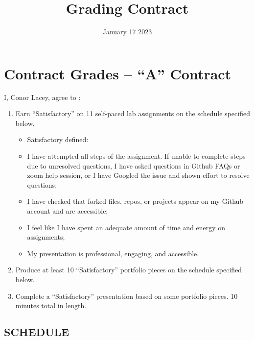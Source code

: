 \documentclass[
]{article}
\title{Grading Contract}
\author{}
\date{\vspace{-2.5em}January 17 2023}
\providecommand{\tightlist}{%
  \setlength{\itemsep}{0pt}\setlength{\parskip}{0pt}}
\begin{document}
\maketitle

\hypertarget{contract-grades-a-contract}{%
\section{Contract Grades -- ``A''
Contract}\label{contract-grades-a-contract}}

I, Conor Lacey, agree to :

\begin{enumerate}
\def\labelenumi{\arabic{enumi})}
\tightlist
\item
  Earn ``Satisfactory'' on 11 self-paced lab assignments on the schedule
  specified below.

  \begin{itemize}
  \tightlist
  \item
    Satisfactory defined:
  \item
    I have attempted all steps of the assignment. If unable to complete
    steps due to unresolved questions, I have asked questions in Github
    FAQs or zoom help session, or I have Googled the issue and shown
    effort to resolve questions;
  \item
    I have checked that forked files, repos, or projects appear on my
    Github account and are accessible;
  \item
    I feel like I have spent an adequate amount of time and energy on
    assignments;
  \item
    My presentation is professional, engaging, and accessible.
  \end{itemize}
\item
  Produce at least 10 ``Satisfactory'' portfolio pieces on the schedule
  specified below.
\item
  Complete a ``Satisfactory'' presentation based on some portfolio
  pieces. 10 minutes total in length.
\end{enumerate}

\hypertarget{schedule}{%
\subsection{SCHEDULE}\label{schedule}}
\end{document}
